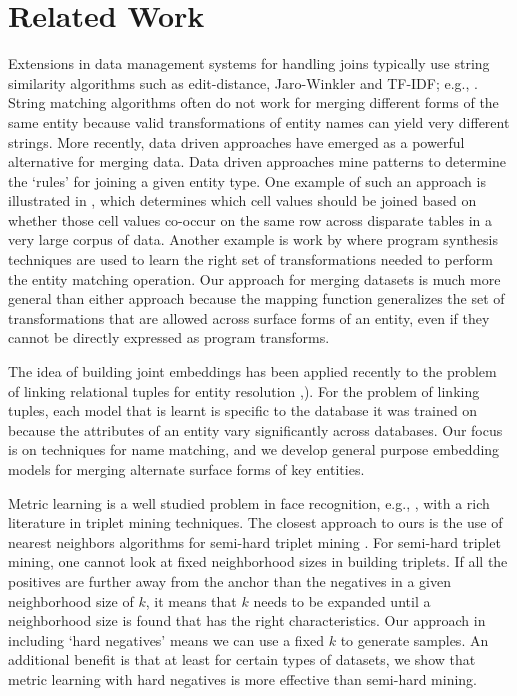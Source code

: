 \section{Related Work}
Extensions in data management systems for handling joins typically use string similarity algorithms such as edit-distance, Jaro-Winkler and TF-IDF; e.g., \cite{Cohen2003}.  String matching algorithms often do not work for merging different forms of the same entity because valid transformations of entity names can yield very different strings.  More recently, data driven approaches have emerged as a powerful alternative for merging data.  Data driven approaches mine patterns to determine the `rules' for joining a given entity type.  One example of such an approach is illustrated in \cite{He:2015:SJS:2824032.2824036}, which determines which cell values should be joined based on whether those cell values co-occur on the same row across disparate tables in a very large corpus of data.  Another example is work by \cite{auto-join-joining-tables-leveraging-transformations} where program synthesis techniques are used to learn the right set of transformations needed to perform the entity matching operation.  Our approach for merging datasets is much more general than either approach because the mapping function generalizes the set of transformations that are allowed across surface forms of an entity, even if they cannot be directly expressed as program transforms.

The idea of building joint embeddings has been applied recently to the problem of linking relational tuples for entity resolution \cite{Mudgal},\cite{Bordawekar18}).  For the problem of linking tuples, each model that is learnt is specific to the database it was trained on because the attributes of an entity vary significantly across databases.  Our focus is on techniques for name matching, and we develop general purpose embedding models for merging alternate surface forms of key entities.  

Metric learning is a well studied problem in face recognition, e.g., \cite{DBLP:conf/cvpr/SchroffKP15}, with a rich literature in triplet mining techniques.  The closest approach to ours is the use of nearest neighbors algorithms for semi-hard triplet mining \cite{DBLP:journals/corr/KumarHC0D17}.  For semi-hard triplet mining, one cannot look at fixed neighborhood sizes in building triplets.  If all the positives are further away from the anchor than the negatives in a given neighborhood size of $k$, it means that $k$ needs to be expanded until a neighborhood size is found that has the right characteristics.  Our approach in including `hard negatives' means we can use a fixed $k$ to generate samples.  An additional benefit is that at least for certain types of datasets, we show that metric learning with hard negatives is more effective than semi-hard mining.

